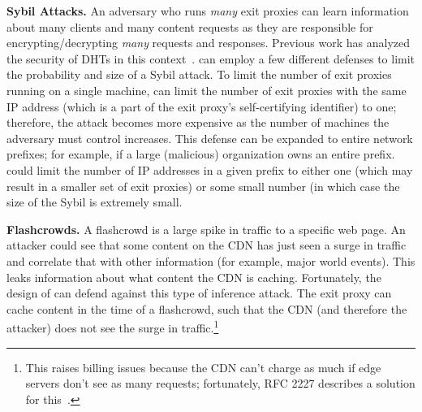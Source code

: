 
\textbf{Sybil Attacks.} An adversary who runs {\it many} exit proxies can learn information 
about many clients and many content requests as they are responsible for encrypting/decrypting 
{\it many} requests and responses.  Previous work has analyzed the security of DHTs in this 
context~\cite{geambasu2009experiences,wolchok2010defeating}.  \system{} can employ a few different defenses to limit the probability and size 
of a Sybil attack.  To limit the number of exit proxies running on a single machine, \system{} can 
limit the number of exit proxies with the same IP address (which is a part of the exit proxy's self-certifying 
identifier) to one; therefore, the attack becomes more 
expensive as the number of machines the adversary must control increases. This defense can be expanded to entire network prefixes; for example, if a large (malicious) organization owns an entire prefix.  \system{} could 
limit the number of IP addresses in a given prefix to either one (which may result in a smaller set of exit proxies) or some small number (in which case the size of the Sybil is extremely small.  

\textbf{Flashcrowds.}  A flashcrowd is a large spike in traffic to a specific web
page. An attacker
could see that some content on the CDN has just seen a surge in traffic and correlate that with 
other information (for example, major world events).  This leaks information about what content the 
CDN is caching.  Fortunately, the design of \system{} can defend against this type of inference attack.  
The exit proxy can cache content in the time of a flashcrowd, such that the CDN (and therefore the attacker) 
does not see the surge in traffic.\footnote{This raises billing issues because the CDN can’t charge as much if edge servers don’t see as many requests; fortunately, RFC 2227 describes a solution for this~\cite{rfc2227}.}  

